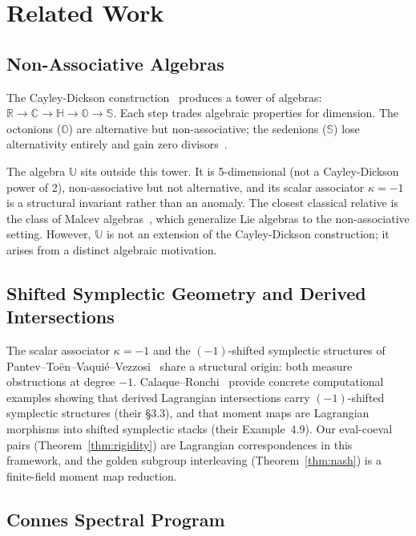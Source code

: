 \documentclass[12pt,oneside]{article}
\theoremstyle{principia}
\theoremstyle{definition}
\theoremstyle{remark}
\providecommand{\UU}{\mathbb{U}}
\providecommand{\RR}{\mathbb{R}}
\providecommand{\CC}{\mathbb{C}}
\providecommand{\HH}{\mathbb{H}}
\providecommand{\OO}{\mathbb{O}}
\providecommand{\SS}{\mathbb{S}}
\providecommand{\kap}{\kappa}
\begin{document}
\section*{Related Work}

\subsection*{Non-Associative Algebras}

The Cayley-Dickson construction~\cite{schafer} produces a tower of algebras: $\RR \to \CC \to \HH \to \OO \to \SS$. Each step trades algebraic properties for dimension. The octonions ($\OO$) are alternative but non-associative; the sedenions ($\SS$) lose alternativity entirely and gain zero divisors~\cite{baez-octonions}.

The algebra $\UU$ sits outside this tower. It is 5-dimensional (not a Cayley-Dickson power of 2), non-associative but not alternative, and its scalar associator $\kap = -1$ is a structural invariant rather than an anomaly. The closest classical relative is the class of Malcev algebras~\cite{malcev}, which generalize Lie algebras to the non-associative setting. However, $\UU$ is not an extension of the Cayley-Dickson construction; it arises from a distinct algebraic motivation.

\subsection*{Shifted Symplectic Geometry and Derived Intersections}

The scalar associator $\kap = -1$ and the $(-1)$-shifted symplectic structures of Pantev--To\"en--Vaqui\'e--Vezzosi~\cite{ptvv} share a structural origin: both measure obstructions at degree $-1$. Calaque--Ronchi~\cite{calaque-ronchi} provide concrete computational examples showing that derived Lagrangian intersections carry $(-1)$-shifted symplectic structures (their \S3.3), and that moment maps are Lagrangian morphisms into shifted symplectic stacks (their Example~4.9). Our eval-coeval pairs (Theorem~\ref{thm:rigidity}) are Lagrangian correspondences in this framework, and the golden subgroup interleaving (Theorem~\ref{thm:nash}) is a finite-field moment map reduction.

\subsection*{Connes Spectral Program}
\end{document}
